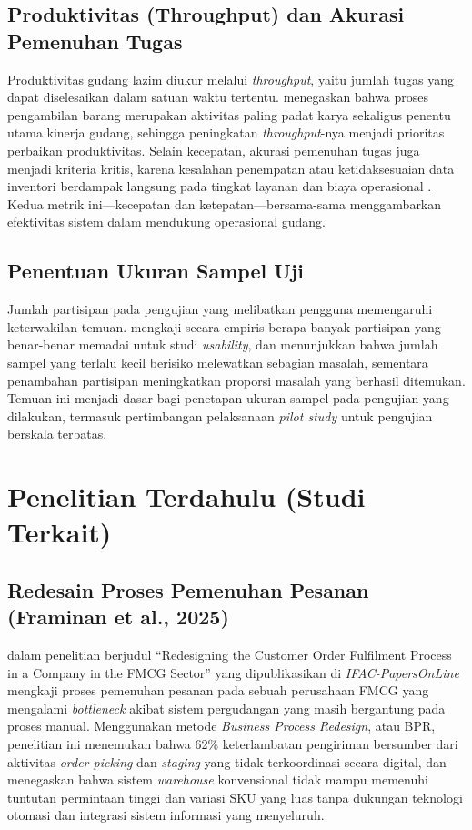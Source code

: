 \subsection{Produktivitas (Throughput) dan Akurasi Pemenuhan Tugas}

Produktivitas gudang lazim diukur melalui \textit{throughput}, yaitu jumlah tugas yang dapat diselesaikan dalam satuan waktu tertentu. \textcite{dekoster2007} menegaskan bahwa proses pengambilan barang merupakan aktivitas paling padat karya sekaligus penentu utama kinerja gudang, sehingga peningkatan \textit{throughput}-nya menjadi prioritas perbaikan produktivitas. Selain kecepatan, akurasi pemenuhan tugas juga menjadi kriteria kritis, karena kesalahan penempatan atau ketidaksesuaian data inventori berdampak langsung pada tingkat layanan dan biaya operasional \autocite{habazin2017}. Kedua metrik ini---kecepatan dan ketepatan---bersama-sama menggambarkan efektivitas sistem dalam mendukung operasional gudang.

\subsection{Penentuan Ukuran Sampel Uji}

Jumlah partisipan pada pengujian yang melibatkan pengguna memengaruhi keterwakilan temuan. \textcite{alroobaea2014} mengkaji secara empiris berapa banyak partisipan yang benar-benar memadai untuk studi \textit{usability}, dan menunjukkan bahwa jumlah sampel yang terlalu kecil berisiko melewatkan sebagian masalah, sementara penambahan partisipan meningkatkan proporsi masalah yang berhasil ditemukan. Temuan ini menjadi dasar bagi penetapan ukuran sampel pada pengujian yang dilakukan, termasuk pertimbangan pelaksanaan \textit{pilot study} untuk pengujian berskala terbatas.

\section{Penelitian Terdahulu (Studi Terkait)}
\label{sec:penelitian-terdahulu}

\subsection{Redesain Proses Pemenuhan Pesanan (Framinan et al., 2025)}

\textcite{framinan2025} dalam penelitian berjudul ``Redesigning the Customer Order Fulfilment Process in a Company in the FMCG Sector'' yang dipublikasikan di \textit{IFAC-PapersOnLine} mengkaji proses pemenuhan pesanan pada sebuah perusahaan FMCG yang mengalami \textit{bottleneck} akibat sistem pergudangan yang masih bergantung pada proses manual. Menggunakan metode \textit{Business Process Redesign}, atau BPR, penelitian ini menemukan bahwa 62\% keterlambatan pengiriman bersumber dari aktivitas \textit{order picking} dan \textit{staging} yang tidak terkoordinasi secara digital, dan menegaskan bahwa sistem \textit{warehouse} konvensional tidak mampu memenuhi tuntutan permintaan tinggi dan variasi SKU yang luas tanpa dukungan teknologi otomasi dan integrasi sistem informasi yang menyeluruh.

